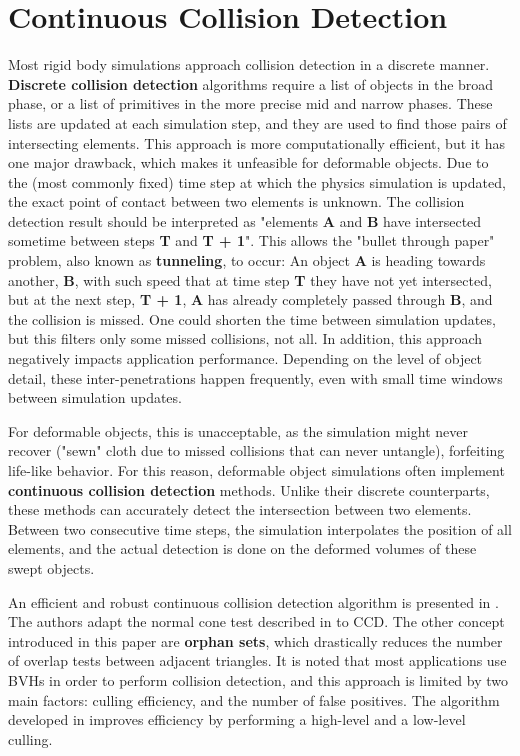 \FloatBarrier
\section{Continuous Collision Detection}
\label{sec:ccd}

Most rigid body simulations approach collision detection in a discrete manner. \textbf{Discrete collision detection} algorithms require a list of objects in the broad phase, or a list of primitives in the more precise mid and narrow phases. These lists are updated at each simulation step, and they are used to find those pairs of intersecting elements. This approach is more computationally efficient, but it has one major drawback, which makes it unfeasible for deformable objects. Due to the (most commonly fixed) time step at which the physics simulation is updated, the exact point of contact between two elements is unknown. The collision detection result should be interpreted as "elements \textbf{A} and \textbf{B} have intersected sometime between steps \textbf{T} and \textbf{T + 1}". This allows the "bullet through paper" problem, also known as \textbf{tunneling}, to occur: An object \textbf{A} is heading towards another, \textbf{B}, with such speed that at time step \textbf{T} they have not yet intersected, but at the next step, \textbf{T + 1}, \textbf{A} has already completely passed through \textbf{B}, and the collision is missed. One could shorten the time between simulation updates, but this filters only some missed collisions, not all. In addition, this approach negatively impacts application performance. Depending on the level of object detail, these inter-penetrations happen frequently, even with small time windows between simulation updates.

For deformable objects, this is unacceptable, as the simulation might never recover ("sewn" cloth due to missed collisions that can never untangle), forfeiting life-like behavior. For this reason, deformable object simulations often implement \textbf{continuous collision detection} methods. Unlike their discrete counterparts, these methods can accurately detect the intersection between two elements. Between two consecutive time steps, the simulation interpolates the position of all elements, and the actual detection is done on the deformed volumes of these swept objects.

An efficient and robust continuous collision detection algorithm is presented in \cite{tang08}. The authors adapt the normal cone test described in \cite{provot97} to CCD. The other concept introduced in this paper are \textbf{orphan sets}, which drastically reduces the number of overlap tests between adjacent triangles. It is noted that most applications use BVHs in order to perform collision detection, and this approach is limited by two main factors: culling efficiency, and the number of false positives. The algorithm developed in \cite{tang08} improves efficiency by performing a high-level and a low-level culling.

